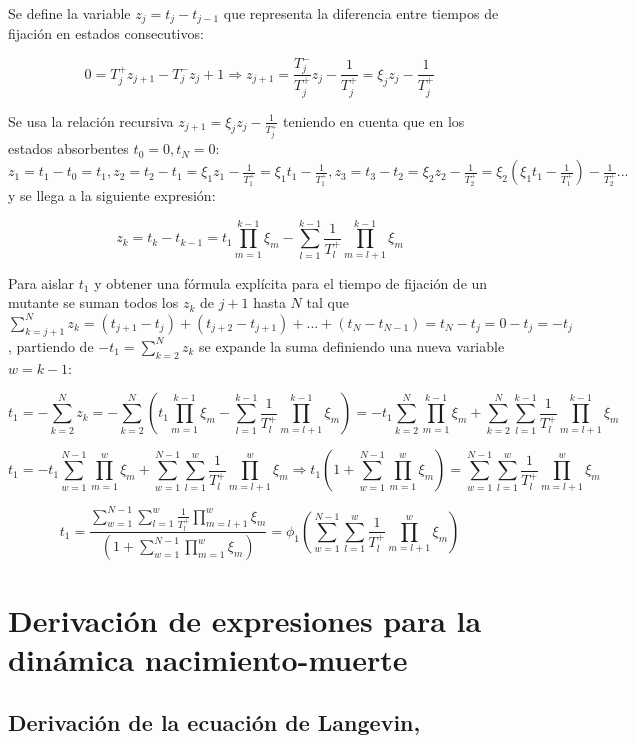 \documentclass[%
 sor,
 jor,
 amsmath,amssymb,
 reprint,%
]{revtex4-2}
\begin{document}
Se define la variable \(z_j=t_{j}-t_{j-1}\) que representa la diferencia entre tiempos de fijación en estados consecutivos:

\[
0=T_j^+z_{j+1}-T_j^-z_j +1\Rightarrow z_{j+1}=\frac{T_j^-}{T_j^+}z_j-\frac{1}{T_j^+}=\xi_j z_j-\frac{1}{T_j^+}
\]

Se usa la relación recursiva \(z_{j+1}=\xi_j z_j-\frac{1}{T_j^+}\) teniendo en cuenta que en los estados absorbentes \(t_0=0,t_N=0\): \(z_1=t_1-t_0=t_1,z_2=t_2-t_1=\xi_1 z_1-\frac{1}{T_1^+}=\xi_1 t_1-\frac{1}{T_1^+},z_3=t_3-t_2=\xi_2z_2-\frac{1}{T_2^+}=\xi_2 \left(\xi_1t_1-\frac{1}{T_1^+}\right)-\frac{1}{T_2^+}...\) y se llega a la siguiente expresión:

\[
z_k=t_k-t_{k-1}=t_1 \prod_{m=1}^{k-1} \xi_m-\sum_{l=1}^{k-1}\frac{1}{T_l^+}\prod_{m=l+1}^{k-1}\xi_m
\]


Para aislar $t_1$ y obtener una fórmula explícita para el tiempo de fijación de un mutante se suman todos los \(z_k\) de $j+1$ hasta $N$ tal que \(\sum_{k=j+1}^{N}z_k=(t_{j+1}-t_j)+(t_{j+2}-t_{j+1})+...+(t_N-t_{N-1})=t_N-t_j=0-t_j=-t_j\), partiendo de \(-t_1=\sum_{k=2}^{N}z_k\) se expande la suma definiendo una nueva variable \(w=k-1\):


\[
t_1=-\sum_{k=2}^{N}z_k=-\sum_{k=2}^{N} \left( t_1 \prod_{m=1}^{k-1} \xi_m-\sum_{l=1}^{k-1}\frac{1}{T_l^+}\prod_{m=l+1}^{k-1}\xi_m \right)=-t_1\sum_{k=2}^{N}\prod_{m=1}^{k-1} \xi_m+\sum_{k=2}^{N}\sum_{l=1}^{k-1}\frac{1}{T_l^+}\prod_{m=l+1}^{k-1}\xi_m 
\]

\[
t_1=-t_1\sum_{w=1}^{N-1}\prod_{m=1}^{w} \xi_m+\sum_{w=1}^{N-1}\sum_{l=1}^{w}\frac{1}{T_l^+}\prod_{m=l+1}^{w}\xi_m \Rightarrow t_1\left(1+ \sum_{w=1}^{N-1}\prod_{m=1}^{w} \xi_m \right)=\sum_{w=1}^{N-1}\sum_{l=1}^{w}\frac{1}{T_l^+}\prod_{m=l+1}^{w}\xi_m 
\]

\[
t_1=\frac{\sum_{w=1}^{N-1}\sum_{l=1}^{w}\frac{1}{T_l^+}\prod_{m=l+1}^{w}\xi_m}{\left(1+ \sum_{w=1}^{N-1}\prod_{m=1}^{w} \xi_m \right)}=\phi_1 \left( \sum_{w=1}^{N-1}\sum_{l=1}^{w}\frac{1}{T_l^+}\prod_{m=l+1}^{w}\xi_m \right )
\]

\hspace{0,5 cm}

\section{Derivación de expresiones para la dinámica nacimiento-muerte} 
\label{ApendiceB}

\subsection{Derivación de la ecuación de Langevin, \cite{CalvoTema3}}
\end{document}
